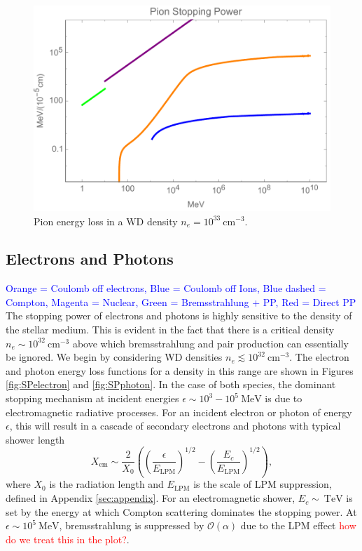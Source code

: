 \documentclass[twocolumn,showpacs,preprintnumbers,amsmath,amssymb,prd]{revtex4}
\newcommand{\OO}{\mathcal{O}}
\def\r{\right)}
\def\l{\left(}
\begin{document}
\begin{figure}
\includegraphics[scale=.45]{SPpion.pdf}
\caption{Pion energy loss in a WD density $n_e = 10^{33} ~\text{cm}^{-3}$.}
\label{fig:SPpion}
\end{figure}

\subsection{Electrons and Photons}
\textcolor{blue}{Orange = Coulomb off electrons, Blue = Coulomb off Ions, Blue dashed = Compton, Magenta = Nuclear, Green = Bremsstrahlung + PP, Red = Direct PP}
The stopping power of electrons and photons is highly sensitive to the density of the stellar medium. This is evident in the fact that there is a critical density $n_e \sim 10^{32} ~\text{cm}^{-3}$ above which bremsstrahlung and pair production can essentially be ignored. We begin by considering WD densities $n_e \lesssim 10^{32} ~\text{cm}^{-3}$. The electron and photon energy loss functions for a density in this range are shown in Figures \ref{fig:SPelectron} and \ref{fig:SPphoton}. In the case of both species, the dominant stopping mechanism at incident energies $\epsilon \sim 10^{3}-10^{5} ~\text{MeV}$ is due to electromagnetic radiative processes. For an incident electron or photon of energy $\epsilon$, this will result in a cascade of secondary electrons and photons with typical shower length
\begin{equation}
X_\text{em} \sim \frac{2}{X_0} \l \l \frac{\epsilon}{E_\text{LPM}}\r^{1/2} - \l \frac{E_c}{E_\text{LPM}}\r^{1/2} \r,
\end{equation}
where $X_0$ is the radiation length and $E_\text{LPM}$ is the scale of LPM suppression, defined in Appendix \ref{sec:appendix}. For an electromagnetic shower, $E_c \sim ~\text{TeV}$ is set by the energy at which Compton scattering dominates the stopping power. At $\epsilon \sim 10^{5} ~\text{MeV}$, bremsstrahlung is suppressed by $\OO(\alpha)$ due to the LPM effect \textcolor{red}{how do we treat this in the plot?}.
\end{document}
